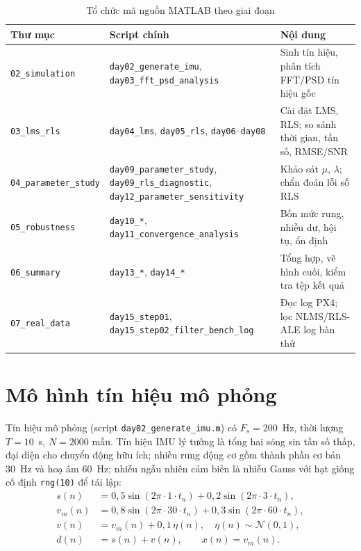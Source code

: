 \documentclass[../main.tex]{subfiles}
\begin{document}
\begin{table}[htbp]
\centering
\caption{Tổ chức mã nguồn MATLAB theo giai đoạn}
\label{tab:stages}
\footnotesize
\begin{tabular}{@{}>{\raggedright\arraybackslash}p{3.3cm}>{\raggedright\arraybackslash}p{5.6cm}>{\raggedright\arraybackslash}p{5.2cm}@{}}
\toprule
\textbf{Thư mục} & \textbf{Script chính} & \textbf{Nội dung} \\
\midrule
\texttt{02\_simulation} & \texttt{day02\_generate\_imu}, \texttt{day03\_fft\_psd\_analysis} & Sinh tín hiệu, phân tích FFT/PSD tín hiệu gốc \\
\texttt{03\_lms\_rls} & \texttt{day04\_lms}, \texttt{day05\_rls}, \texttt{day06}--\texttt{day08} & Cài đặt LMS, RLS; so sánh thời gian, tần số, RMSE/SNR \\
\texttt{04\_parameter\_study} & \texttt{day09\_parameter\_study}, \texttt{day09\_rls\_diagnostic}, \texttt{day12\_parameter\_sensitivity} & Khảo sát $\mu$, $\lambda$; chẩn đoán lỗi số RLS \\
\texttt{05\_robustness} & \texttt{day10\_*}, \texttt{day11\_convergence\_analysis} & Bốn mức rung, nhiễu dư, hội tụ, ổn định \\
\texttt{06\_summary} & \texttt{day13\_*}, \texttt{day14\_*} & Tổng hợp, vẽ hình cuối, kiểm tra tệp kết quả \\
\texttt{07\_real\_data} & \texttt{day15\_step01}, \texttt{day15\_step02\_filter\_bench\_log} & Đọc log PX4; lọc NLMS/RLS-ALE log bàn thử \\
\bottomrule
\end{tabular}
\end{table}

\section{Mô hình tín hiệu mô phỏng}
\label{sec:simmodel}

Tín hiệu mô phỏng (script \texttt{day02\_generate\_imu.m}) có $F_s=200$~Hz, thời lượng $T=10$~s, $N=2000$ mẫu. Tín hiệu IMU lý tưởng là tổng hai sóng sin tần số thấp, đại diện cho chuyển động hữu ích; nhiễu rung động cơ gồm thành phần cơ bản 30~Hz và hoạ âm 60~Hz; nhiễu ngẫu nhiên cảm biến là nhiễu Gauss với hạt giống cố định \texttt{rng(10)} để tái lập:
\begin{align}
s(n)&=0{,}5\sin(2\pi\cdot 1\cdot t_n)+0{,}2\sin(2\pi\cdot 3\cdot t_n),\\
v_m(n)&=0{,}8\sin(2\pi\cdot 30\cdot t_n)+0{,}3\sin(2\pi\cdot 60\cdot t_n),\\
v(n)&=v_m(n)+0{,}1\,\eta(n),\quad \eta(n)\sim\mathcal{N}(0,1),\\
d(n)&=s(n)+v(n),\qquad x(n)=v_m(n).
\end{align}
\end{document}
